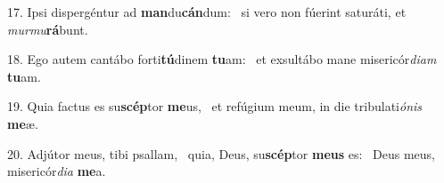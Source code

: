17. Ipsi dispergéntur ad \textbf{man}du\textbf{cán}dum: \ast\  si vero non fúerint saturáti, et \textit{mur}\textit{mu}\textbf{rá}bunt.\

18. Ego autem cantábo forti\textbf{tú}dinem \textbf{tu}am: \ast\  et exsultábo mane misericór\textit{di}\textit{am} \textbf{tu}am.\

19. Quia factus es su\textbf{scép}tor \textbf{me}us, \ast\  et refúgium meum, in die tribulati\textit{ó}\textit{nis} \textbf{me}æ.\

20. Adjútor meus, tibi psallam, \dag\  quia, Deus, su\textbf{scép}tor \textbf{me}\textbf{us} es: \ast\  Deus meus, misericór\textit{di}\textit{a} \textbf{me}a.\


